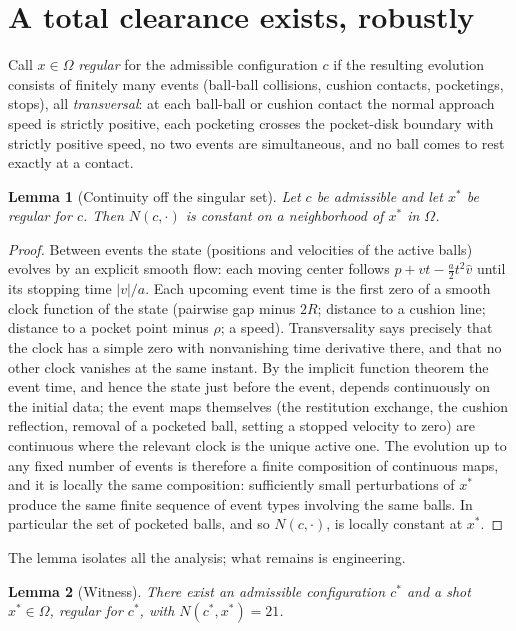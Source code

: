 \documentclass[11pt]{article}
\newtheorem{lemma}{Lemma}
\theoremstyle{definition}
\theoremstyle{remark}
\newcommand{\OO}{\Omega}
\begin{document}
\section{A total clearance exists, robustly}
\label{sec:theorem}

Call $x \in \OO$ \emph{regular} for the admissible configuration $c$
if the resulting evolution consists of finitely many events (ball-ball
collisions, cushion contacts, pocketings, stops), all
\emph{transversal}: at each ball-ball or cushion contact the normal
approach speed is strictly positive, each pocketing crosses the
pocket-disk boundary with strictly positive speed, no two events are
simultaneous, and no ball comes to rest exactly at a contact.

\begin{lemma}[Continuity off the singular set]
\label{lem:continuity}
Let $c$ be admissible and let $x^{*}$ be regular for $c$. Then
$N(c, \cdot)$ is constant on a neighborhood of $x^{*}$ in $\OO$.
\end{lemma}

\begin{proof}
Between events the state (positions and velocities of the active
balls) evolves by an explicit smooth flow: each moving center follows
$p + v t - \tfrac{a}{2} t^{2} \hat v$ until its stopping time
$|v| / a$. Each upcoming event time is the first zero of a smooth
clock function of the state (pairwise gap minus $2R$; distance to a
cushion line; distance to a pocket point minus $\rho$; a speed).
Transversality says precisely that the clock has a simple zero with
nonvanishing time derivative there, and that no other clock vanishes
at the same instant. By the implicit function theorem the event time,
and hence the state just before the event, depends continuously on
the initial data; the event maps themselves (the restitution
exchange, the cushion reflection, removal of a pocketed ball, setting
a stopped velocity to zero) are continuous where the relevant clock
is the unique active one. The evolution up to any fixed number of
events is therefore a finite composition of continuous maps, and it
is locally the same composition: sufficiently small perturbations of
$x^{*}$ produce the same finite sequence of event types involving the
same balls. In particular the set of pocketed balls, and so
$N(c, \cdot)$, is locally constant at $x^{*}$.
\end{proof}

The lemma isolates all the analysis; what remains is engineering.

\begin{lemma}[Witness]
\label{lem:witness}
There exist an admissible configuration $c^{*}$ and a shot
$x^{*} \in \OO$, regular for $c^{*}$, with $N(c^{*}, x^{*}) = 21$.
\end{lemma}
\end{document}
